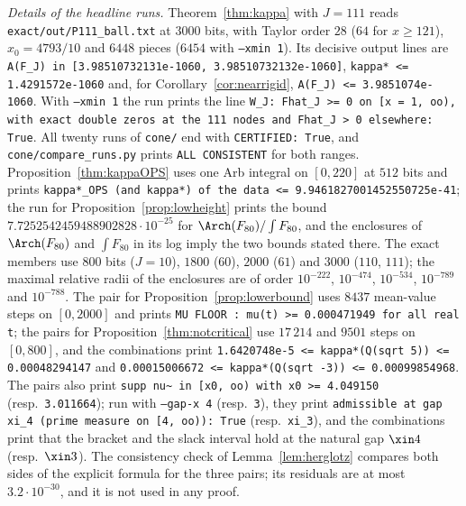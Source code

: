 \emph{Details of the headline runs.} Theorem~\ref{thm:kappa} with $J=111$ reads \nolinkurl{exact/out/P111_ball.txt} at $3000$ bits, with Taylor
order $28$ ($64$ for $x\ge121$), $x_0=4793/10$ and $6448$ pieces ($6454$ with \texttt{--xmin 1}). Its decisive output lines are
\texttt{A(F\_J) in [3.98510732131e-1060, 3.98510732132e-1060]}, \texttt{kappa* <= 1.4291572e-1060} and, for Corollary~\ref{cor:nearrigid},
\texttt{A(F\_J) <= 3.9851074e-1060}. With \texttt{--xmin 1} the run prints the line \texttt{W\_J: Fhat\_J >= 0 on [x = 1, oo), with exact double
zeros at the 111 nodes and Fhat\_J > 0 elsewhere: True}. All twenty runs of \nolinkurl{cone/} end with \texttt{CERTIFIED: True}, and
\nolinkurl{cone/compare_runs.py} prints \texttt{ALL CONSISTENT} for both ranges. Proposition~\ref{thm:kappaOPS} uses one Arb
integral on $[0,220]$ at $512$ bits and prints \texttt{kappa*\_OPS (and kappa*) of the data <= 9.9461827001452550725e-41}; the run for
Proposition~\ref{prop:lowheight} prints the bound $7.7252542459488902828\cdot10^{-25}$ for $\Arch(F_{80})/\int F_{80}$, and the enclosures of
$\Arch(F_{80})$ and $\int F_{80}$ in its log imply the two bounds stated there. The exact members use $800$ bits ($J=10$), $1800$ ($60$), $2000$ ($61$)
and $3000$ ($110$, $111$); the maximal relative radii of the enclosures are of order $10^{-222}$, $10^{-474}$, $10^{-534}$, $10^{-789}$ and
$10^{-788}$. The pair for Proposition~\ref{prop:lowerbound} uses $8437$ mean-value steps on $[0,2000]$ and prints \texttt{MU FLOOR : mu(t) >= 0.000471949 for
all real t}; the pairs for Proposition~\ref{thm:notcritical} use $17\,214$ and $9501$ steps on $[0,800]$, and the combinations print
\texttt{1.6420748e-5 <= kappa*(Q(sqrt 5)) <= 0.00048294147} and \texttt{0.00015006672 <= kappa*(Q(sqrt -3)) <= 0.00099854968}. The pairs also
print \texttt{supp nu\textasciitilde{} in [x0, oo) with x0 >= 4.049150} (resp.\ \texttt{3.011664}); run with \texttt{--gap-x 4} (resp.\ \texttt{3}),
they print \texttt{admissible at gap xi\_4 (prime measure on [4, oo)): True} (resp.\ \texttt{xi\_3}), and the combinations print that the
bracket and the slack interval hold at the natural gap $\xin4$ (resp.\ $\xin3$). The consistency
check of Lemma~\ref{lem:herglotz} compares both sides of the explicit formula for the three pairs; its residuals are at most $3.2\cdot10^{-30}$, and
it is not used in any proof.

